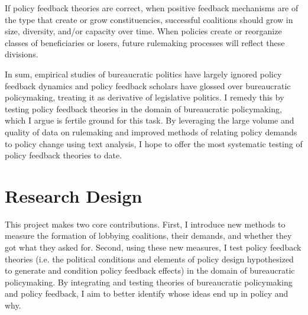 If policy feedback theories are correct, when positive feedback mechanisms are of the type that create or grow constituencies, successful coalitions should grow in size, diversity, and/or capacity over time. When policies create or reorganize classes of beneficiaries or losers, future rulemaking processes will reflect these divisions. %

In sum, empirical studies of bureaucratic politics have largely ignored policy feedback dynamics and policy feedback scholars have glossed over bureaucratic policymaking, treating it as derivative of legislative politics. I remedy this by testing policy feedback theories in the domain of bureaucratic policymaking, which I argue is fertile ground for this task. By leveraging the large volume and quality of data on rulemaking and improved methods of relating policy demands to policy change using text analysis, I hope to offer the most systematic testing of policy feedback theories to date.




%


















\section{Research Design}

This project makes two core contributions. First, I introduce new methods to 
measure the formation of lobbying coalitions, their demands, and whether they got what they asked for. 
Second, using these new measures, I test policy feedback theories (i.e. the political conditions and elements of policy design hypothesized to generate and condition policy feedback effects) in the domain of bureaucratic policymaking. By integrating and testing theories of bureaucratic policymaking and policy feedback, I aim to better identify whose ideas end up in policy and why.

